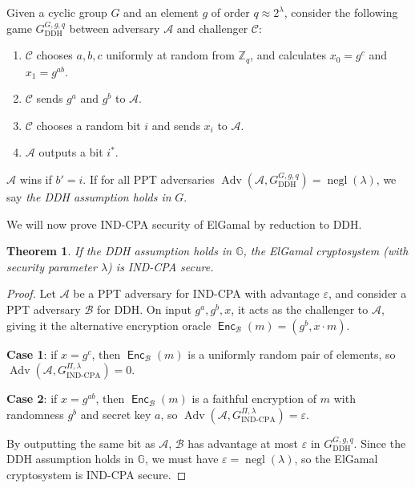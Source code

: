 \documentclass[12pt,a4paper]{article}
\DeclareMathOperator{\negl}{\text{negl}}
\DeclareMathOperator{\Adv}{\text{Adv}}
\DeclareMathOperator{\Enc}{\mathsf{Enc}}
\newtheorem{theorem}{Theorem}
\theoremstyle{definition}
\begin{document}
\begin{definition}
    Given a cyclic group $G$ and an element $g$ of order $q \approx 2^\lambda$, consider the following game $G_{\text{DDH}}^{G, g, q}$ between adversary $\mathcal{A}$ and challenger $\mathcal{C}$:
    \begin{enumerate}
        \item $\mathcal{C}$ chooses $a, b, c$ uniformly at random from $\mathbb{Z}_q$, and calculates $x_0=g^c$ and $x_1=g^{ab}$.
        \item $\mathcal{C}$ sends $g^a$ and $g^b$ to $\mathcal{A}$.
        \item $\mathcal{C}$ chooses a random bit $i$ and sends $x_i$ to $\mathcal{A}$.
        \item $\mathcal{A}$ outputs a bit $i^*$.
    \end{enumerate}
    $\mathcal{A}$ wins if $b' = i$. If for all PPT adversaries $\Adv(\mathcal{A}, G_{\text{DDH}}^{G, g, q})=\negl(\lambda)$, we say \textit{the DDH assumption holds in} $G$.
\end{definition}

We will now prove IND-CPA security of ElGamal by reduction to DDH.
\begin{theorem}
    If the DDH assumption holds in $\mathbb{G}$, the ElGamal cryptosystem (with security parameter $\lambda$) is IND-CPA secure.
\end{theorem}
\begin{proof}
    Let $\mathcal{A}$ be a PPT adversary for IND-CPA with advantage $\varepsilon$, and consider a PPT adversary $\mathcal{B}$ for DDH. On input $g^a, g^b, x$, it acts as the challenger to $\mathcal{A}$, giving it the alternative encryption oracle $\Enc_{\mathcal{B}}(m)=(g^b, x\cdot m)$.
    
    \textbf{Case 1}: if $x=g^c$, then $\Enc_{\mathcal{B}}(m)$ is a uniformly random pair of elements, so $\Adv\left(\mathcal{A},G^{\Pi,\lambda}_{\text{IND-CPA}}\right)=0$.
    
    \textbf{Case 2}: if $x=g^{ab}$, then $\Enc_{\mathcal{B}}(m)$ is a faithful encryption of $m$ with randomness $g^b$ and secret key $a$, so $\Adv\left(\mathcal{A},G^{\Pi,\lambda}_{\text{IND-CPA}}\right)=\varepsilon$.

    By outputting the same bit as $\mathcal{A}$, $\mathcal{B}$ has advantage at most $\varepsilon$ in $G_{\text{DDH}}^{G, g, q}$. Since the DDH assumption holds in $\mathbb{G}$, we must have $\varepsilon=\negl(\lambda)$, so the ElGamal cryptosystem is IND-CPA secure.
\end{proof}
\end{document}
